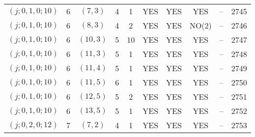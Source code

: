 \begin{longtable}{|c|c|c|c|c|c|c|c|c|c|}
$(j; 0, 1, 0; 10)$ & 6 & $(7, 3)$ & 4 & 1 & YES & YES & YES & -- & 2745\\
$(j; 0, 1, 0; 10)$ & 6 & $(8, 3)$ & 4 & 2 & YES & YES & NO(2) & -- & 2746\\
$(j; 0, 1, 0; 10)$ & 6 & $(10, 3)$ & 5 & 10 & YES & YES & YES & -- & 2747\\
$(j; 0, 1, 0; 10)$ & 6 & $(11, 3)$ & 5 & 1 & YES & YES & YES & -- & 2748\\
$(j; 0, 1, 0; 10)$ & 6 & $(11, 4)$ & 5 & 1 & YES & YES & YES & -- & 2749\\
$(j; 0, 1, 0; 10)$ & 6 & $(11, 5)$ & 6 & 1 & YES & YES & YES & -- & 2750\\
$(j; 0, 1, 0; 10)$ & 6 & $(12, 5)$ & 5 & 2 & YES & YES & YES & -- & 2751\\
$(j; 0, 1, 0; 10)$ & 6 & $(13, 5)$ & 5 & 1 & YES & YES & YES & -- & 2752\\
$(j; 0, 2, 0; 12)$ & 7 & $(7, 2)$ & 4 & 1 & YES & YES & YES & -- & 2753
\end{longtable}

